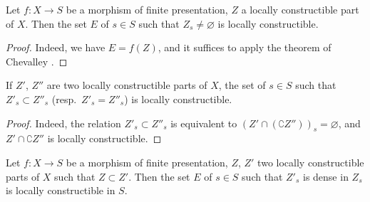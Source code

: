 \begin{proposition}[9.5.1]
\label{IV.9.5.1}
Let $f:X\to S$ be a morphism of finite presentation, $Z$ a locally constructible part of $X$.
Then the set $E$ of $s\in S$ such that $Z_s\neq\varnothing$ is locally constructible.
\end{proposition}

\begin{proof}
Indeed, we have $E=f(Z)$, and it suffices to apply the theorem of Chevalley .
\end{proof}

\begin{corollary}[9.5.2]
\label{IV.9.5.2}
If $Z'$, $Z''$ are two locally constructible parts of $X$, the set of $s\in S$ such that $Z'_s\subset Z''_s$ (resp.\ $Z'_s=Z''_s$) is locally constructible.
\end{corollary}

\begin{proof}
Indeed, the relation $Z'_s\subset Z''_s$ is equivalent to $(Z'\cap(\complement Z''))_s=\varnothing$, and $Z'\cap\complement Z''$ is locally constructible.
\end{proof}

\begin{proposition}[9.5.3]
\label{IV.9.5.3}
Let $f:X\to S$ be a morphism of finite presentation, $Z$, $Z'$ two locally constructible parts of $X$ such that $Z\subset Z'$.
Then the set $E$ of $s\in S$ such that $Z'_s$ is dense in $Z_s$ is locally constructible in $S$.
\end{proposition}

